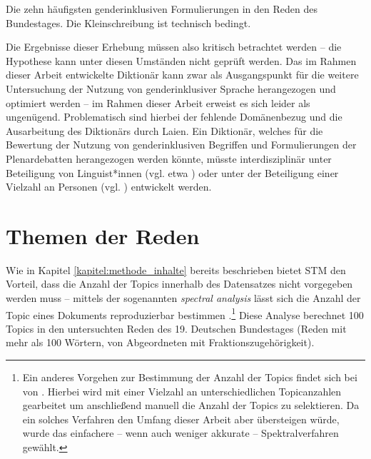 \documentclass[12pt, 
    twoside=false, 
    bibliography=totoc, 
    numbers=endperiod, 
    headings=normal, 
    toc=chapterentrydotfill
    ]{scrbook}
\begin{document}
\begin{table}[htb]
    \centering
    \caption[Die zehn häufigsten genderinklusiven Formulierungen in den Reden des Bundestages]{Die zehn häufigsten genderinklusiven Formulierungen in den Reden des Bundestages. Die Kleinschreibung ist technisch bedingt.}
    
    \label{table:top_gender_phrasen}
\end{table}


Die Ergebnisse dieser Erhebung müssen also kritisch betrachtet werden -- die Hypothese kann unter diesen Umständen nicht geprüft werden. Das im Rahmen dieser Arbeit entwickelte Diktionär kann zwar als Ausgangspunkt für die weitere Untersuchung der Nutzung von genderinklusiver Sprache herangezogen und optimiert werden -- im Rahmen dieser Arbeit erweist es sich leider als ungenügend. Problematisch sind hierbei der fehlende Domänenbezug und die Ausarbeitung des Diktionärs durch Laien. Ein Diktionär, welches für die Bewertung der Nutzung von genderinklusiven Begriffen und Formulierungen der Plenardebatten herangezogen werden könnte, müsste interdisziplinär unter Beteiligung von Linguist*innen (vgl. etwa \parencite{remus_sentiws_2010}) oder unter der Beteiligung einer Vielzahl an Personen (vgl. \parencite{haselmayer_2017}) entwickelt werden.


\section{Themen der Reden}\label{kapitel:auswertung_themen}

Wie in Kapitel \ref{kapitel:methode_inhalte} bereits beschrieben bietet STM den Vorteil, dass die Anzahl der Topics innerhalb des Datensatzes nicht vorgegeben werden muss -- mittels der sogenannten \emph{spectral analysis} lässt sich die Anzahl der Topic eines Dokuments reproduzierbar bestimmen \parencites[11]{roberts_2018}[30ff.]{roberts_2016}.\footnote{Ein anderes Vorgehen zur Bestimmung der Anzahl der Topics findet sich bei  von \textcite[6ff.]{roberts_2014}. Hierbei wird mit einer Vielzahl an unterschiedlichen Topicanzahlen gearbeitet um anschließend manuell die Anzahl der Topics zu selektieren. Da ein solches Verfahren den Umfang dieser Arbeit aber übersteigen würde, wurde das einfachere -- wenn auch weniger akkurate -- Spektralverfahren gewählt.} Diese Analyse berechnet 100 Topics in den untersuchten Reden des 19. Deutschen Bundestages (Reden mit mehr als 100 Wörtern, von Abgeordneten mit Fraktionszugehörigkeit).
\end{document}
